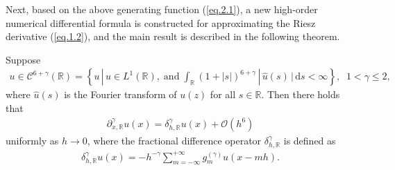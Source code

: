\documentclass{siamart171218}
\numberwithin{theorem}{section}
\numberwithin{equation}{section}
\begin{document}
Next, based on the above generating function (\ref{eq.2.1}),
a new high-order
numerical differential formula is constructed
for approximating the Riesz derivative (\ref{eq.1.2}), and the main result is
described in the following theorem.

\begin{theorem}\label{Th.2.1}
Suppose
\begin{equation*}
\begin{aligned}\displaystyle
u\in\mathscr{C}^{{6+\gamma}}\left(\mathds{{R}}\right)=\left\{u\,|\,u\in L^1(\mathds{{R}}),
\;\mathrm{and}\;\int_{\mathds{{R}}}\left(1+|s|\right)^{{6+\gamma}}\,|\,\hat{u}(s)
\,|\,\mathrm{d}s<\infty\right\},\;\;1<\gamma\leq2,
\end{aligned}
\end{equation*}
where $\hat{u}(s)$ is the Fourier transform of $u(z)$ for all $s\in \mathds{{R}}$.
Then there holds that
\begin{equation*}
\begin{aligned}\displaystyle
\partial_{x,\mathds{R}}^\gamma u(x)= {\delta}_{h,\mathds{R}}^{\gamma}u(x)
+\mathcal{O}\left(h^6\right)
\end{aligned}
\end{equation*}
uniformly as $h\rightarrow0$, where the fractional difference operator
${\delta}_{h,\mathds{R}}^{\gamma}$ is defined as
\begin{equation*}
\begin{aligned}
\displaystyle {\delta}_{h,\mathds{R}}^{\gamma}u(x)
=-{h^{-\gamma}}\sum\limits_{m=-\infty}^{+\infty}
g_{m}^{(\gamma)}u\left(x-mh\right).
\end{aligned}
\end{equation*}
\end{theorem}
\end{document}
